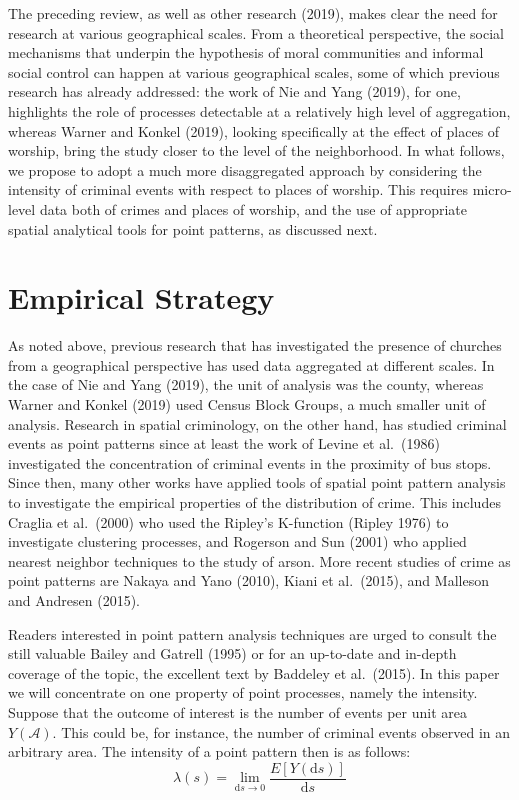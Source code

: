 \documentclass[smallextended]{svjour3}       %
\begin{document}
The preceding review, as well as other research (2019), makes clear the
need for research at various geographical scales. From a theoretical
perspective, the social mechanisms that underpin the hypothesis of moral
communities and informal social control can happen at various
geographical scales, some of which previous research has already
addressed: the work of Nie and Yang (2019), for one, highlights the role
of processes detectable at a relatively high level of aggregation,
whereas Warner and Konkel (2019), looking specifically at the effect of
places of worship, bring the study closer to the level of the
neighborhood. In what follows, we propose to adopt a much more
disaggregated approach by considering the intensity of criminal events
with respect to places of worship. This requires micro-level data both
of crimes and places of worship, and the use of appropriate spatial
analytical tools for point patterns, as discussed next.

\hypertarget{methods}{%
\section{Empirical Strategy}\label{methods}}

As noted above, previous research that has investigated the presence of
churches from a geographical perspective has used data aggregated at
different scales. In the case of Nie and Yang (2019), the unit of
analysis was the county, whereas Warner and Konkel (2019) used Census
Block Groups, a much smaller unit of analysis. Research in spatial
criminology, on the other hand, has studied criminal events as point
patterns since at least the work of Levine et al.~(1986) investigated
the concentration of criminal events in the proximity of bus stops.
Since then, many other works have applied tools of spatial point pattern
analysis to investigate the empirical properties of the distribution of
crime. This includes Craglia et al.~(2000) who used the Ripley's
K-function (Ripley 1976) to investigate clustering processes, and
Rogerson and Sun (2001) who applied nearest neighbor techniques to the
study of arson. More recent studies of crime as point patterns are
Nakaya and Yano (2010), Kiani et al.~(2015), and Malleson and Andresen
(2015).

Readers interested in point pattern analysis techniques are urged to
consult the still valuable Bailey and Gatrell (1995) or for an
up-to-date and in-depth coverage of the topic, the excellent text by
Baddeley et al.~(2015). In this paper we will concentrate on one
property of point processes, namely the intensity. Suppose that the
outcome of interest is the number of events per unit area
\(Y(\mathcal{A})\). This could be, for instance, the number of criminal
events observed in an arbitrary area. The intensity of a point pattern
then is as follows: \[
\lambda(s)=\lim_{\text{d}s \to 0}\frac{E[Y(\text{d}s)]}{\text{d}s}
\]
\end{document}
